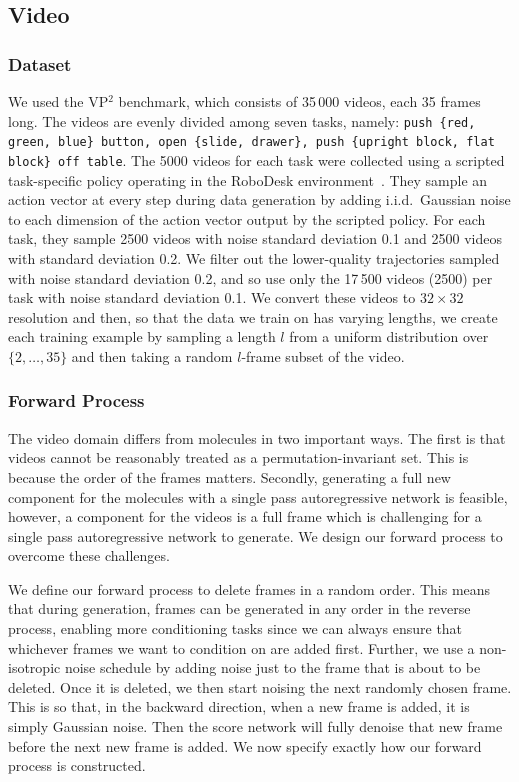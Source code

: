 \subsection{Video}
\subsubsection{Dataset}
We used the VP$^2$ benchmark, which consists of 35\,000 videos, each 35 frames long. The videos are evenly divided among seven tasks, namely: \texttt{push \{red, green, blue\} button, open \{slide, drawer\}, push \{upright block, flat block\} off table}. The 5000 videos for each task were collected using a scripted task-specific policy operating in the RoboDesk environment~\citep{kannan2021robodesk}. They sample an action vector at every step during data generation by adding i.i.d.\ Gaussian noise to each dimension of the action vector output by the scripted policy. For each task, they sample 2500 videos with noise standard deviation 0.1 and 2500 videos with standard deviation 0.2. We filter out the lower-quality trajectories sampled with noise standard deviation 0.2, and so use only the 17\,500 videos (2500) per task with noise standard deviation 0.1. We convert these videos to $32\times32$ resolution and then, so that the data we train on has varying lengths, we create each training example by sampling a length $l$ from a uniform distribution over $\{2,\ldots,35\}$ and then taking a random $l$-frame subset of the video.

\subsubsection{Forward Process}
The video domain differs from molecules in two important ways. The first is that videos cannot be reasonably treated as a permutation-invariant set. This is because the order of the frames matters. Secondly, generating a full new component for the molecules with a single pass autoregressive network is feasible, however, a component for the videos is a full frame which is challenging for a single pass autoregressive network to generate. We design our forward process to overcome these challenges.

We define our forward process to delete frames in a random order. This means that during generation, frames can be generated in any order in the reverse process, enabling more conditioning tasks since we can always ensure that whichever frames we want to condition on are added first. Further, we use a non-isotropic noise schedule by adding noise just to the frame that is about to be deleted. Once it is deleted, we then start noising the next randomly chosen frame. This is so that, in the backward direction, when a new frame is added, it is simply Gaussian noise. Then the score network will fully denoise that new frame before the next new frame is added. We now specify exactly how our forward process is constructed.

